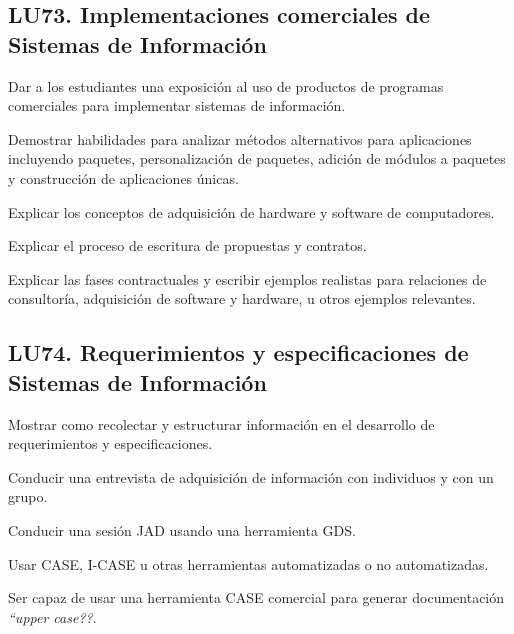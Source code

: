 \subsection{LU73. Implementaciones comerciales de Sistemas de Información}\label{sec:LU73}
\begin{LearningUnit}
\begin{LUGoal}
\item Dar a los estudiantes una exposición al uso de productos de programas comerciales para implementar sistemas de información.
\end{LUGoal}

\begin{LUObjective}
\item Demostrar habilidades para analizar métodos alternativos para aplicaciones incluyendo paquetes, personalización de paquetes, adición de módulos a paquetes y construcción de aplicaciones únicas.
\item Explicar los conceptos de adquisición de hardware y software de computadores.
\item Explicar el proceso de escritura de propuestas y contratos.
\item Explicar las fases contractuales y escribir ejemplos realistas para relaciones de consultoría, adquisición de software y hardware, u otros ejemplos relevantes.
\end{LUObjective}
\end{LearningUnit}

\subsection{LU74. Requerimientos y especificaciones de Sistemas de Información}\label{sec:LU74}
\begin{LearningUnit}
\begin{LUGoal}
\item Mostrar como recolectar y estructurar información en el desarrollo de requerimientos y especificaciones.
\end{LUGoal}

\begin{LUObjective}
\item Conducir una entrevista de adquisición de información con individuos y con un grupo.
\item Conducir una sesión JAD usando una herramienta GDS.
\item Usar CASE, I-CASE u otras herramientas automatizadas o no automatizadas.
\item Ser capaz de usar una herramienta CASE comercial para generar documentación {\it ``upper case??}.
\end{LUObjective}
\end{LearningUnit}

